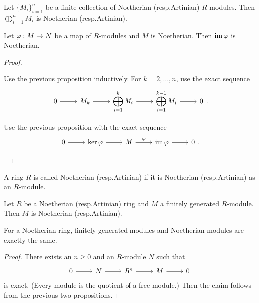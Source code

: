 \begin{cor}[3.4]
  \lv
  \begin{enum}
    \io
    Let $\{M_i\}_{i=1}^n$ be a finite collection of Noetherian (resp.\@ Artinian) $R$-modules.
    Then $\bigoplus_{i=1}^n M_i$ is Noetherian (resp.\@ Artinian).

    \io
    Let $\varphi: M \to N$ be a map of $R$-modules and $M$ is Noetherian.
    Then $\operatorname{im}\varphi$ is Noetherian.
  \end{enum}
\end{cor}

\begin{proof}
  \lv
  \begin{enum}
    \io
    Use the previous proposition inductively.
    For $k=2,\ldots,n$, use the exact sequence
    \begin{equation*}
      \begin{tikzcd}
	0 \ar[r] & M_k \ar[r] & \ds \bigoplus_{i=1}^k M_i \ar[r] & \ds \bigoplus_{i=1}^{k-1} M_i \ar[r] & 0
      \end{tikzcd}
      .
    \end{equation*}

    \io
    Use the previous proposition with the exact sequence
    \begin{equation*}
      \begin{tikzcd}
	0 \ar[r] & \ker\ph \ar[r] & M \ar[r, "\ph"] & \im\ph \ar[r] & 0
      \end{tikzcd}
      .
      \qedhere
    \end{equation*}
  \end{enum}
\end{proof}

\begin{defn}[3.5]
  A ring $R$ is called Noetherian (resp.\@ Artinian) if it is Noetherian (resp.\@ Artinian) as an $R$-module.  
\end{defn}

\begin{prop}[3.6]
  Let $R$ be a Noetherian (resp.\@ Artinian) ring and $M$ a finitely generated $R$-module.
  Then $M$ is Noetherian (resp.\@ Artinian).
\end{prop}

\begin{rmk}
  For a Noetherian ring, finitely generated modules and Noetherian modules are exactly the same.
\end{rmk}

\begin{proof}
  There exists an $n \geq 0$ and an $R$-module $N$ such that
  \begin{equation*}
    \begin{tikzcd}
      0 \ar[r] & N \ar[r] & R^n \ar[r] & M \ar[r] & 0
    \end{tikzcd}
  \end{equation*}
  is exact.
  (Every module is the quotient of a free module.)
  Then the claim follows from the previous two propositions.
\end{proof}

